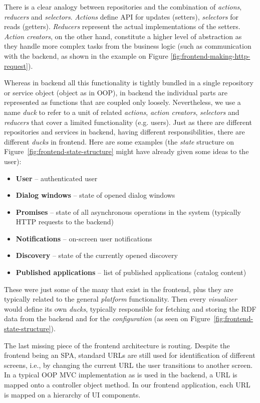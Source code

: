 There is a clear analogy between repositories and the combination of \emph{actions}, \emph{reducers} and \emph{selectors}. \emph{Actions} define API for updates (setters), \emph{selectors} for reads (getters). \emph{Reducers} represent the actual implementations of the setters. \emph{Action creators}, on the other hand,  constitute a higher level of abstraction as they handle more complex tasks from the business logic (such as communication with the backend, as shown in the example on Figure \ref{fig:frontend-making-http-request}). 

Whereas in backend all this functionality is tightly bundled in a single repository or service object (object as in OOP), in backend the individual parts are represented as functions that are coupled only loosely. Nevertheless, we use a name \emph{duck} to refer to a unit of related \emph{actions}, \emph{action creators}, \emph{selectors} and \emph{reducers} that cover a limited functionality (e.g. users). Just as there are different repositories and services in backend, having different responsibilities, there are different \emph{ducks} in frontend. Here are some examples (the \emph{state} structure on Figure~\ref{fig:frontend-state-structure} might have already given some ideas to the user):

\begin{itemize}
\item \textbf{User} -- authenticated user
\item \textbf{Dialog windows} -- state of opened dialog windows
\item \textbf{Promises} -- state of all asynchronous operations in the system (typically HTTP requests to the backend)
\item \textbf{Notifications }-- on-screen user notifications
\item \textbf{Discovery} -- state of the currently opened discovery
\item \textbf{Published applications} -- list of published applications (catalog content)
\end{itemize}

These were just some of the many that exist in the frontend, plus they are typically related to the general \emph{platform} functionality. Then every \emph{visualizer} would define its own \emph{ducks}, typically responsible for fetching and storing the RDF data from the backend and for the \emph{configuration} (as seen on Figure~\ref{fig:frontend-state-structure}).

The last missing piece of the frontend architecture is routing. Despite the frontend being an SPA, standard URLs are still used for identification of different screens, i.e., by changing the current URL the user transitions to another screen. In a typical OOP MVC implementation as is used in the backend, a URL is mapped onto a controller object method. In our frontend application, each URL is mapped on a hierarchy of UI components. 

